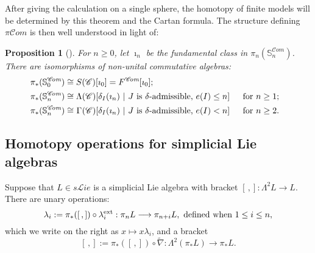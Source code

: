 \documentclass[11pt]{amsart} \renewcommand{\baselinestretch}{1.2}
\theoremstyle{plain}
\newtheorem{prop}[thm]{Proposition}
\theoremstyle{definition}
\renewcommand{\to}{\longrightarrow}
\newcommand{\scrL}{\mathscr{L}}
\newcommand{\scrC}{\mathscr{C}}
\newcommand{\CommOperad}{{\scrC}}
\newcommand{\PA}[1]{\pi#1}
\newcommand{\algs}{{\scrC\!\textit{om}}}
\newcommand{\liealgs}{{\scrL\!\textit{ie}}}
\renewcommand{\mapsto}{\longmapsto}
\begin{document}
\begin{Constructing homotopy operations}
\noindent After giving the calculation on a single sphere, the homotopy of finite models will be determined by this theorem and the Cartan formula. The structure defining $\PA{\algs}$ is then well understood in light of:
\begin{prop}[{\cite[Proposition 2.7]{MR1089001}}]
\label{homotopy of comm alg sphere}
\noindent For $n\geq0$, let $\imath_n$ be the fundamental class in $\pi_n(\mathbb{S}^\algs_n)$. There  are isomorphisms of non-unital commutative algebras:
\begin{alignat*}{2}
\pi_*(\mathbb{S}^\algs_0)
&\cong
S(\CommOperad)[\imath_0]=F^{\algs}[\imath_0];%
\\
\pi_*(\mathbb{S}^\algs_n)
&\cong
\makebox[\widthof{$\Lambda$}][c]{$\Lambda$}(\CommOperad)[\delta_I(\imath_n)\ |\ \textup{$J$ is $\delta$-admissible, $e(I)\leq n$}]%
&\ \ &\makebox[\widthof{for $n\geq1$}][c]{for $n\geq1$;}\\
\pi_*(\mathbb{S}^\algs_n)
&\cong
\makebox[\widthof{$\Lambda$}][c]{$\Gamma$}(\CommOperad)[\delta_I(\imath_n)\ |\ \textup{$J$ is $\delta$-admissible, $e(I)< n$}]%
&\ \ &\makebox[\widthof{for $n\geq1$}][c]{for $n\geq2$.}%
\end{alignat*}
\end{prop}

\subsection{Homotopy operations for simplicial Lie algebras}\label{Homotopy operations for simplicial Lie algebras}
Suppose that $L\in s \liealgs$ is a simplicial Lie algebra with bracket $[\,,]:\Lambda^2L\to L$. There are unary operations:
\[\lambda_i:=\pi_*([\,,])\circ\lambda_i^\textup{ext}:\pi_nL\to \pi_{n+i}L,\textup{ defined when }1\leq i\leq n,\]
which we write on the right as $x\mapsto x\lambda_i$, and a bracket
\[[\,,]:=\pi_*([\,,])\circ\widetilde{\nabla}:\Lambda^2(\pi_*L)\to \pi_{*}L.\]


\end{Constructing homotopy operations}
\end{document}
